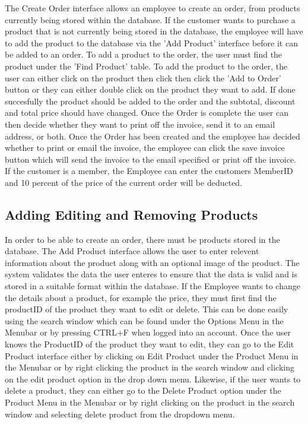 The Create Order interface allows an employee to create an order, from products currently being stored within the database. If the customer wants to purchase a product that is not currently being stored in the database, the employee will have to add the product to the database via the 'Add Product' interface before it can be added to an order. To add a product to the order, the user must find the product under the 'Find Product' table. To add the product to the order, the user can either click on the product then click then click the 'Add to Order' button or they can either double click on the product they want to add. If done succesfully the product should be added to the order and the subtotal, discount and total price should have changed. Once the Order is complete the user can then decide whether they want to print off the invoice, send it to an email address, or both. Once the Order has been created and the employee has decided whether to print or email the invoice, the employee can click the save invoice button which will send the invoice to the email specified or print off the invoice. If the customer is a member, the Employee can enter the customers MemberID and 10 percent of the price of the current order will be deducted.

\subsection{Adding Editing and Removing Products}

In order to be able to create an order, there must be products stored in the database. The Add Product interface allows the user to enter relevent information about the product along with an optional image of the product. The system validates the data the user enteres to ensure that the data is valid and is stored in a suitable format within the database. If the Employee wants to change the details about a product, for example the price, they must first find the productID of the product they want to edit or delete. This can be done easily using the search window which can be found under the Options Menu in the Menubar or by pressing CTRL+F when logged into an account. Once the user knows the ProductID of the product they want to edit, they can go to the Edit Product interface either by clicking on Edit Product under the Product Menu in the Menubar or by right clicking the product in the search window and clicking on the edit product option in the drop down menu. Likewise, if the user wants to delete a product, they can either go to the Delete Product option under the Product Menu in the Menubar or by right clicking on the product in the search window and selecting delete product from the dropdown menu.

